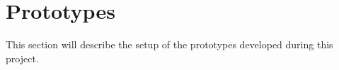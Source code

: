\section{Prototypes}
This section will describe the setup of the prototypes developed during this project.


\FloatBarrier

\FloatBarrier

\FloatBarrier


